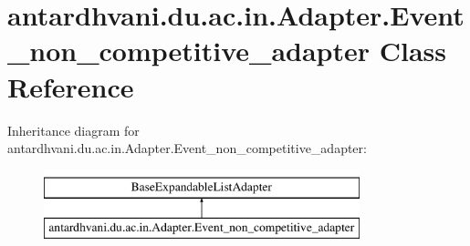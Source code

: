 \hypertarget{classantardhvani_1_1du_1_1ac_1_1in_1_1_adapter_1_1_event__non__competitive__adapter}{}\section{antardhvani.\+du.\+ac.\+in.\+Adapter.\+Event\+\_\+non\+\_\+competitive\+\_\+adapter Class Reference}
\label{classantardhvani_1_1du_1_1ac_1_1in_1_1_adapter_1_1_event__non__competitive__adapter}
Inheritance diagram for antardhvani.\+du.\+ac.\+in.\+Adapter.\+Event\+\_\+non\+\_\+competitive\+\_\+adapter\+:\begin{figure}[H]
\begin{center}
\leavevmode
\includegraphics[height=2.000000cm]{classantardhvani_1_1du_1_1ac_1_1in_1_1_adapter_1_1_event__non__competitive__adapter}
\end{center}
\end{figure}
